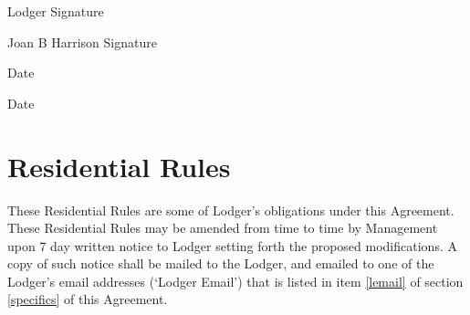\documentclass[12pt,letterpaper]{article}
\newcommand{\rules}{Residential Rules}							%
\newcommand{\mom}{Joan B Harrison}
\newcommand{\management}{Management}
\newcommand{\lodger}{Lodger}
\newcommand{\lemail}{Lodger Email}
\begin{document}
\begin{minipage}[t]{0.65\textwidth}
	\begin{flushright}
		\vspace{1cm}\noindent	\lodger{} Signature\hspace{0.2cm}\makebox[2in]{\hrulefill}

		\vspace{1cm}\noindent	\mom{} Signature\hspace{0.2cm}\makebox[2in]{\hrulefill}
	\end{flushright}
\end{minipage}
\hfill
\begin{minipage}[t]{0.25\textwidth}
	\begin{flushright}
		\vspace{1cm}\noindent Date\hspace{0.2cm}\makebox[2cm]{\hrulefill} 

		\vspace{1cm}\noindent Date\hspace{0.2cm}\makebox[2cm]{\hrulefill} 
	\end{flushright}
\end{minipage}

\newpage
\section{\rules{}} \label{rules}

 These \rules{} are some of \lodger{}'s obligations under this Agreement. These Residential Rules may be amended from time to time by \management{} upon 7 day written notice to \lodger{} setting forth the proposed modifications. A copy of such notice shall be mailed to the \lodger{}, and emailed to one of the \lodger{}'s email addresses (`\lemail{}') that is listed in item \ref{lemail} of section \ref{specifics} of this Agreement.
\end{document}
